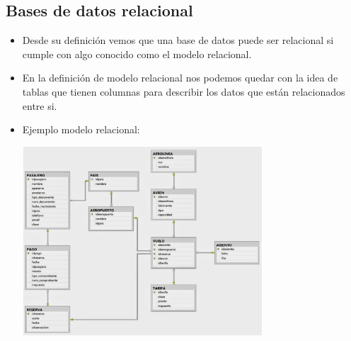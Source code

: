 \documentclass[%
 reprint,
 amsmath,amssymb,
 aps,
]{revtex4-1}
\begin{document}
\subsection{Bases de datos relacional}
	          \begin{itemize}
		\item Desde su definición vemos que una base de datos puede ser relacional si cumple con algo conocido como el modelo relacional.
                     \item En la definición de modelo relacional nos podemos quedar con la idea de tablas que tienen columnas para describir los datos que están relacionados entre si.\cite{comparison}
		\item Ejemplo modelo relacional:\cite{Nicolas}
                     \begin{center}
		\includegraphics[width=9cm]{./Imagenes/1}
		\end{center}	
	          \end{itemize}
\end{document}
